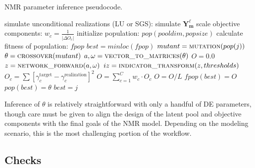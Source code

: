 \begin{algorithm}
    \caption{\gls{NMR} parameter inference pseudocode.}\label{alg:nmropt}
    \begin{algorithmic}[1]
        \State simulate unconditional realizations (LU or SGS):
        \State simulate $\mathbf{Y^{\ell}_m}$
        \EndFor
        \EndFor
        \State scale objective components:
        \State $w_{c} = \frac{1}{\bar{|\Delta O_{c}|}}$
        \EndFor
        \State initialize population: $pop(pool dim, popsize)$ 
        \State calculate fitness of population: $fpop$
        \State $best = minloc(fpop)$ 
         
        \State $mutant = \Call{mutation}{pop(j)}$ 
        \State $\theta = \Call{crossover}{mutant}$ 
        \State $a, \omega = \Call{vector\_to\_matrices}{\theta}$ 
        \State $O = 0.0$
        \State $z = \Call{network\_forward}{a, \omega}$ 
        \State $iz = \Call{indicator\_transform}{z, thresholds}$
        \State $O_{c} = \sum [ \gamma^{\text{target}}_{c} - \gamma^{\text{realization}}_{c}]^{2}$
        \EndFor
        \State $O = \sum_{c=1}^{C}w_{c}\cdot O_{c}$
        \EndFor
        \State $O = O / L$
        \State $fpop(best) = O$ 
        \State $pop(best) = \theta$ 
        \State $best = j$ 
        \EndIf
        \EndFor
        \EndFor {}
    \end{algorithmic}
\end{algorithm}

Inference of $\theta$ is relatively straightforward with only a handful of \gls{DE} parameters, though care must be given to align the design of the latent pool and objective components with the final goals of the \gls{NMR} model. Depending on the modeling scenario, this is the most challenging portion of the workflow.

\FloatBarrier
\subsection{Checks}
\label{subsec:04checks}

